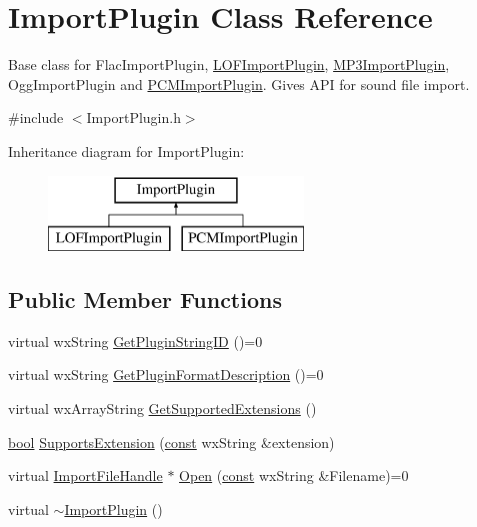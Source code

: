 \hypertarget{class_import_plugin}{}\section{Import\+Plugin Class Reference}
\label{class_import_plugin}


Base class for Flac\+Import\+Plugin, \hyperlink{class_l_o_f_import_plugin}{L\+O\+F\+Import\+Plugin}, \hyperlink{class_m_p3_import_plugin}{M\+P3\+Import\+Plugin}, Ogg\+Import\+Plugin and \hyperlink{class_p_c_m_import_plugin}{P\+C\+M\+Import\+Plugin}. Gives A\+PI for sound file import.  




{\ttfamily \#include $<$Import\+Plugin.\+h$>$}

Inheritance diagram for Import\+Plugin\+:\begin{figure}[H]
\begin{center}
\leavevmode
\includegraphics[height=2.000000cm]{class_import_plugin}
\end{center}
\end{figure}
\subsection*{Public Member Functions}
\begin{DoxyCompactItemize}
\item 
virtual wx\+String \hyperlink{class_import_plugin_a1bf59f8e7e7b17f471e08df49b64d0cd}{Get\+Plugin\+String\+ID} ()=0
\item 
virtual wx\+String \hyperlink{class_import_plugin_a5913a90328e88944c600c128e969a99e}{Get\+Plugin\+Format\+Description} ()=0
\item 
virtual wx\+Array\+String \hyperlink{class_import_plugin_a0a1e1e1414dd7de2bbfab554a48ed07a}{Get\+Supported\+Extensions} ()
\item 
\hyperlink{mac_2config_2i386_2lib-src_2libsoxr_2soxr-config_8h_abb452686968e48b67397da5f97445f5b}{bool} \hyperlink{class_import_plugin_a980704189e8e32026590db558e916405}{Supports\+Extension} (\hyperlink{getopt1_8c_a2c212835823e3c54a8ab6d95c652660e}{const} wx\+String \&extension)
\item 
virtual \hyperlink{class_import_file_handle}{Import\+File\+Handle} $\ast$ \hyperlink{class_import_plugin_abe16a65c8e0575fc7dcb0a9531f8f0a7}{Open} (\hyperlink{getopt1_8c_a2c212835823e3c54a8ab6d95c652660e}{const} wx\+String \&Filename)=0
\item 
virtual \hyperlink{class_import_plugin_ae60cf51aca334d1fe9b9b9b55aa99d30}{$\sim$\+Import\+Plugin} ()
\end{DoxyCompactItemize}
